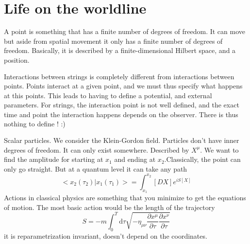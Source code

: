 \documentclass[a4paper]{book}
\theoremstyle{definition}
\theoremstyle{remark}
\begin{document}
\chapter{Life on the worldline}

A point is something that has a finite number of degrees of freedom. It can move but aside from spatial movement it only has a finite number of degrees of freedom. Basically, it is described by a finite-dimensional Hilbert space, and a position. \par \medskip 

Interactions between strings is completely different from interactions between points. Points interact at a given point, and we must thus specify what happens at this points. This leads to having to define a potential, and external parameters. For strings, the interaction point is not well defined, and the exact time and point the interaction happens depends on the observer. There is thus nothing to define ! :) \par \medskip 

Scalar particles. We consider the Klein-Gordon field. Particles don't have inner degrees of freedom. It can only exist somewhere. Described by $X^\mu$. We want to find the amplitude for starting at $x_1$ and ending at $x_2$.Classically, the point can only go straight. But at a quantum level it can take any path
\begin{equation}
    <x_2(\tau_2)|x_1(\tau_1)> = \int_{x_1}^{x_2} [DX]e^{iS[X]}
\end{equation} 
Actions in classical physics are something that you minimize to get the equations of motion. The most basic action would be the length of the  trajectory 
\begin{equation}
    S = -m\int_0^T \text{d}\tau \sqrt{-\eta_{\mu\nu} \frac{\partial x^\mu}{\partial \tau} \frac{\partial x^\nu}{\partial \tau}}
\end{equation}
it is reparametrization invariant, doesn't depend on the coordinates. 
\end{document}
